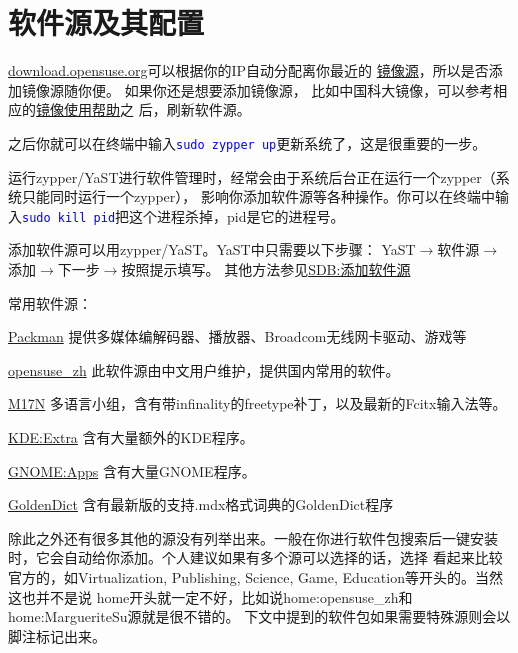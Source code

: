 \documentclass[11pt]{article}
\newcommand{\command}[1]{\texttt{\textcolor{blue}{#1}}}
\begin{document}
\section{软件源及其配置}
\url{download.opensuse.org}可以根据你的IP自动分配离你最近的
\href{http://mirrors.opensuse.org/}{镜像源}，所以是否添加镜像源随你便。
如果你还是想要添加镜像源，
比如中国科大镜像，可以参考相应的\href{https://lug.ustc.edu.cn/wiki/mirrors/help/opensuse}{镜像使用帮助}之
后，刷新软件源。

之后你就可以在终端中输入\command{sudo zypper up}更新系统了，这是很重要的一步。

运行zypper/YaST进行软件管理时，经常会由于系统后台正在运行一个zypper（系统只能同时运行一个zypper），
影响你添加软件源等各种操作。你可以在终端中输入\command{sudo kill pid}把这个进程杀掉，pid是它的进程号。

添加软件源可以用zypper/YaST。YaST中只需要以下步骤：
YaST$\rightarrow$软件源$\rightarrow$添加$\rightarrow$下一步$\rightarrow$按照提示填写。
其他方法参见\href{https://zh.opensuse.org/SDB:%E6%B7%BB%E5%8A%A0%E8%BD%AF%E4%BB%B6%E6%BA%90}{SDB:添加软件源}

常用软件源：\begin{compactdesc}
 \item[\href{http://mirrors.hust.edu.cn/packman/suse/openSUSE_13.1/}{Packman}]
 提供多媒体编解码器、播放器、Broadcom无线网卡驱动、游戏等
 \item[\href{http://download.opensuse.org/repositories/home:/opensuse_zh/openSUSE_13.1/}{opensuse\_zh}]
 此软件源由中文用户维护，提供国内常用的软件。
 \item[\href{http://download.opensuse.org/repositories/M17N/openSUSE_13.1/}{M17N}]
 多语言小组，含有带infinality的freetype补丁，以及最新的Fcitx输入法等。
 \item[\href{http://download.opensuse.org/repositories/KDE:/Extra/openSUSE_13.1/}{KDE:Extra}]
 含有大量额外的KDE程序。
 \item[\href{http://download.opensuse.org/repositories/GNOME:/Apps/openSUSE_13.1/}{GNOME:Apps}]
 含有大量GNOME程序。
 \item[\href{http://download.opensuse.org/repositories/office:/goldendict/openSUSE_13.1/}{GoldenDict}]
 含有最新版的支持.mdx格式词典的GoldenDict程序
\end{compactdesc}

除此之外还有很多其他的源没有列举出来。一般在你进行软件包搜索后一键安装时，它会自动给你添加。个人建议如果有多个源可以选择的话，选择
看起来比较官方的，如Virtualization, Publishing, Science, Game, Education等开头的。当然这也并不是说
home开头就一定不好，比如说home:opensuse\_zh和home:MargueriteSu源就是很不错的。
下文中提到的软件包如果需要特殊源则会以脚注标记出来。
\end{document}
